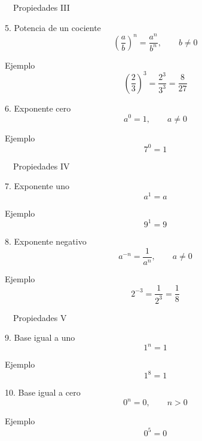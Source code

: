 \documentclass[aspectratio=169,10pt,handout]{beamer}
\newcommand{\iconoDesarrollo}{\faBrain}
\begin{document}
	\begin{frame}{\iconoDesarrollo\ \ Propiedades III}
		\begin{block}{5. Potencia de un cociente}
			\[
			\left(\frac{a}{b}\right)^n = \frac{a^n}{b^n}, \qquad b\neq 0
			\]
		\end{block}
		
		\begin{exampleblock}{Ejemplo}
			\[
			\left(\frac{2}{3}\right)^3 = \frac{2^3}{3^3}=\frac{8}{27}
			\]
		\end{exampleblock}
		
		\pause
		
		\begin{block}{6. Exponente cero}
			\[
			a^0 = 1, \qquad a\neq 0
			\]
		\end{block}
		
		\begin{exampleblock}{Ejemplo}
			\[
			7^0 = 1
			\]
		\end{exampleblock}
	\end{frame}
	
	\begin{frame}{\iconoDesarrollo\ \ Propiedades IV}
		\begin{block}{7. Exponente uno}
			\[
			a^1 = a
			\]
		\end{block}
		
		\begin{exampleblock}{Ejemplo}
			\[
			9^1 = 9
			\]
		\end{exampleblock}
		
		\pause
		
		\begin{block}{8. Exponente negativo}
			\[
			a^{-n}=\frac{1}{a^n}, \qquad a\neq 0
			\]
		\end{block}
		
		\begin{exampleblock}{Ejemplo}
			\[
			2^{-3}=\frac{1}{2^3}=\frac{1}{8}
			\]
		\end{exampleblock}
	\end{frame}
	
	\begin{frame}{\iconoDesarrollo\ \ Propiedades V}
		\begin{block}{9. Base igual a uno}
			\[
			1^n = 1
			\]
		\end{block}
		
		\begin{exampleblock}{Ejemplo}
			\[
			1^8 = 1
			\]
		\end{exampleblock}
		
		\pause
		
		\begin{block}{10. Base igual a cero}
			\[
			0^n = 0, \qquad n>0
			\]
		\end{block}
		
		\begin{exampleblock}{Ejemplo}
			\[
			0^5 = 0
			\]
		\end{exampleblock}
	\end{frame}
	
\end{document}
